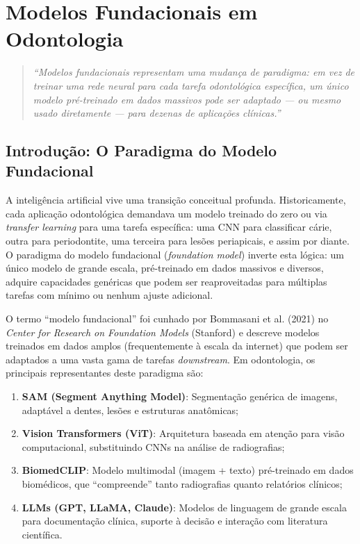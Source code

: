 \chapter{Modelos Fundacionais em Odontologia}
\label{cap:modelos-fundacionais}
\nivelcinco

\begin{quote}
\textit{``Modelos fundacionais representam uma mudança de paradigma: em vez de treinar uma rede neural para cada tarefa odontológica específica, um único modelo pré-treinado em dados massivos pode ser adaptado --- ou mesmo usado diretamente --- para dezenas de aplicações clínicas.''}
\end{quote}

\section{Introdução: O Paradigma do Modelo Fundacional}

A inteligência artificial vive uma transição conceitual profunda. Historicamente, cada aplicação odontológica demandava um modelo treinado do zero ou via \textit{transfer learning} para uma tarefa específica: uma CNN para classificar cárie, outra para periodontite, uma terceira para lesões periapicais, e assim por diante. O paradigma do modelo fundacional (\textit{foundation model}) inverte esta lógica: um único modelo de grande escala, pré-treinado em dados massivos e diversos, adquire capacidades genéricas que podem ser reaproveitadas para múltiplas tarefas com mínimo ou nenhum ajuste adicional.

O termo ``modelo fundacional'' foi cunhado por Bommasani et al. (2021) no \textit{Center for Research on Foundation Models} (Stanford) e descreve modelos treinados em dados amplos (frequentemente à escala da internet) que podem ser adaptados a uma vasta gama de tarefas \textit{downstream}. Em odontologia, os principais representantes deste paradigma são:

\begin{enumerate}
    \item \textbf{SAM (Segment Anything Model)}: Segmentação genérica de imagens, adaptável a dentes, lesões e estruturas anatômicas;
    \item \textbf{Vision Transformers (ViT)}: Arquitetura baseada em atenção para visão computacional, substituindo CNNs na análise de radiografias;
    \item \textbf{BiomedCLIP}: Modelo multimodal (imagem + texto) pré-treinado em dados biomédicos, que ``compreende'' tanto radiografias quanto relatórios clínicos;
    \item \textbf{LLMs (GPT, LLaMA, Claude)}: Modelos de linguagem de grande escala para documentação clínica, suporte à decisão e interação com literatura científica.
\end{enumerate}

